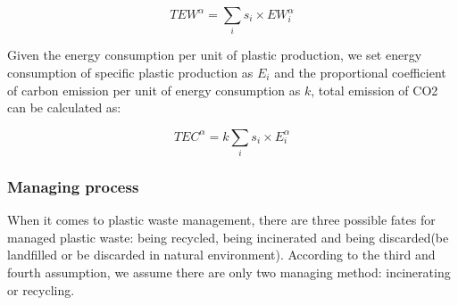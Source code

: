 \documentclass{mcmthesis}
\begin{document}
\begin{equation}
TEW^{\alpha} = \sum_i{s_i}\times EW_i^\alpha
\label{EW}
\end{equation}

Given the energy consumption per unit of plastic production, we set energy consumption of specific plastic production as $E_i$ and the proportional coefficient of carbon emission per unit of energy consumption as $k$, total emission of CO2 can be calculated as: 

\begin{equation}
TEC^\alpha = k\sum_i{s_i}\times E_i^\alpha
\label{EC}
\end{equation}





\subsubsection{Managing process}

When it comes to plastic waste management, there are three possible fates for managed plastic waste: being recycled, being incinerated and being discarded(be landfilled or be discarded in natural environment). According to the third and fourth assumption, we assume there are only two managing method: incinerating or recycling.

\end{document}
